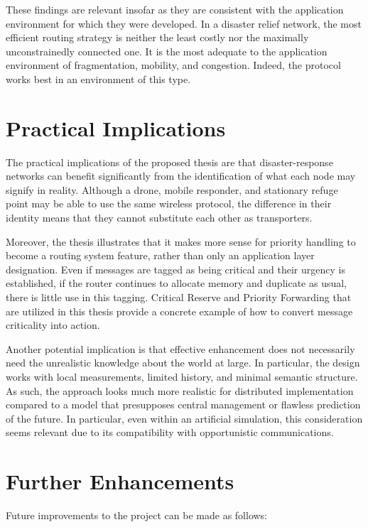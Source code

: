 These findings are relevant insofar as they are consistent with the application environment for which they were developed. In a disaster relief network, the most efficient routing strategy is neither the least costly nor the maximally unconstrainedly connected one. It is the most adequate to the application environment of fragmentation, mobility, and congestion. Indeed, the protocol works best in an environment of this type.

\section{Practical Implications}
The practical implications of the proposed thesis are that disaster-response networks can benefit significantly from the identification of what each node may signify in reality. Although a drone, mobile responder, and stationary refuge point may be able to use the same wireless protocol, the difference in their identity means that they cannot substitute each other as transporters.

Moreover, the thesis illustrates that it makes more sense for priority handling to become a routing system feature, rather than only an application layer designation. Even if messages are tagged as being critical and their urgency is established, if the router continues to allocate memory and duplicate as usual, there is little use in this tagging. Critical Reserve and Priority Forwarding that are utilized in this thesis provide a concrete example of how to convert message criticality into action.

Another potential implication is that effective enhancement does not necessarily need the unrealistic knowledge about the world at large. In particular, the design works with local measurements, limited history, and minimal semantic structure. As such, the approach looks much more realistic for distributed implementation compared to a model that presupposes central management or flawless prediction of the future. In particular, even within an artificial simulation, this consideration seems relevant due to its compatibility with opportunistic communications.

\section{Further Enhancements}
Future improvements to the project can be made as follows:

